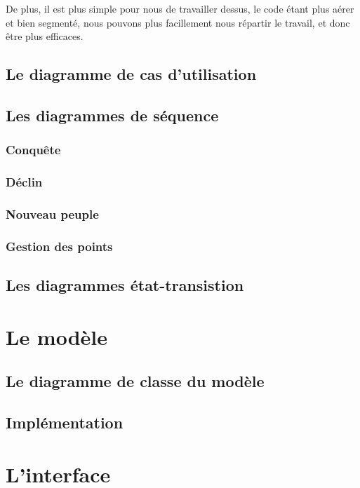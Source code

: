 \documentclass[11pt]{report}
\begin{document}
			De plus, il est plus simple pour nous de travailler dessus, le code étant plus aérer et bien segmenté, nous pouvons plus facillement nous répartir le travail, et donc être plus efficaces. 

	\section{Le diagramme de cas d'utilisation}

	\section{Les diagrammes de séquence}

		\subsection{Conquête}

		\subsection{Déclin}

		\subsection{Nouveau peuple}

		\subsection{Gestion des points}

	\section{Les diagrammes état-transistion}

\chapter{Le modèle}

	\section{Le diagramme de classe du modèle}

	\section{Implémentation}

\chapter{L'interface}
\end{document}
